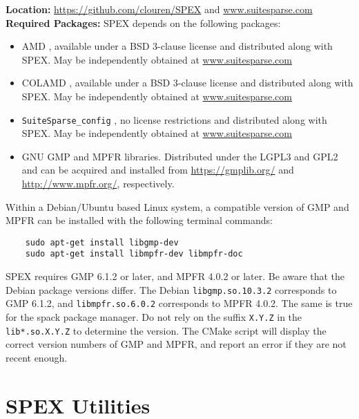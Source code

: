 \documentclass[12pt]{report}
\theoremstyle{definition}
\begin{document}
\noindent \textbf{Location:} \url{https://github.com/clouren/SPEX} and
\url{www.suitesparse.com}\\

\noindent \textbf{Required Packages:} SPEX depends on the following packages:
    \begin{itemize} 
    \item AMD \cite{amestoy1996approximate,amestoy2004algorithmamd}, available under a BSD
3-clause license and distributed along with SPEX. May be independently obtained at \url{www.suitesparse.com}
    \item COLAMD \cite{davis2004column,davis2004algorithmcolamd}, available under a BSD
3-clause license and distributed along with SPEX. May be independently obtained at \url{www.suitesparse.com}
    \item
    \verb|SuiteSparse_config| \cite{davis2020suitesparse}, no license restrictions and distributed along with SPEX. May be independently obtained at \url{www.suitesparse.com}
    \item GNU GMP \cite{granlund2015gnu} and MPFR
\cite{fousse2007mpfr} libraries. Distributed under the LGPL3 and GPL2 and can be acquired and installed
from \url{https://gmplib.org/} and \url{http://www.mpfr.org/}, respectively.

    \end{itemize}

Within a Debian/Ubuntu based Linux system, a compatible version of GMP and MPFR can be installed with the following terminal commands:

{\small
\begin{verbatim}
    sudo apt-get install libgmp-dev
    sudo apt-get install libmpfr-dev libmpfr-doc
\end{verbatim} }

SPEX requires GMP 6.1.2 or later, and MPFR 4.0.2 or later.
Be aware that the Debian package versions differ.
The Debian \verb'libgmp.so.10.3.2' corresponds to GMP 6.1.2,
and \verb'libmpfr.so.6.0.2' corresponds to MPFR 4.0.2.
The same is true for the spack package manager.
Do not rely on the suffix \verb'X.Y.Z' in the \verb'lib*.so.X.Y.Z' to
determine the version.  The CMake script will display the correct
version numbers of GMP and MPFR, and report an error if they are not
recent enough.

\chapter{SPEX Utilities} \label{ch:Util}
\end{document}
